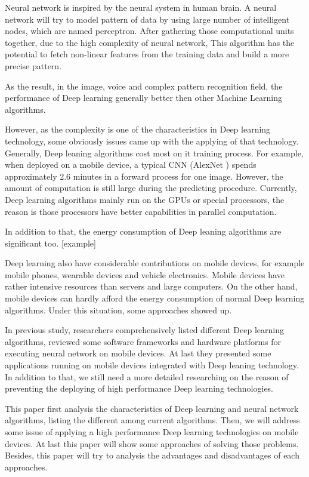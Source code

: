 \documentclass[article]{aaltoseries}
\begin{document}
Neural network is inspired by the neural system in human brain. A neural network will 
try to model pattern of data by using large number of intelligent nodes, which are named perceptron. 
After gathering those computational units together, due to the high complexity of neural network, 
This algorithm has the potential to fetch non-linear features from the training data 
and build a more precise pattern.

As the result, in the image, voice and complex pattern recognition field, the performance of Deep learning
generally better then other Machine Learning algorithms.  

However, as the complexity is one of the characteristics in Deep learning technology, some obviously
issues came up with the applying of that technology. Generally, Deep leaning algorithms cost most 
on it training process. For example, when deployed on a mobile device, a typical CNN (AlexNet \cite{NIPS2012_4824}) 
spends approximately 2.6 minutes in a forward process for one image. However, the amount of computation is 
still large
during the predicting procedure. Currently, Deep learning algorithms mainly run on the GPUs or special processors, 
the reason is those processors have better capabilities in parallel computation.

In addition to that, the energy consumption of Deep leaning algorithms are significant too. [example]

Deep learning also have considerable contributions on mobile devices, for example mobile phones, 
wearable devices and vehicle electronics. Mobile devices have rather intensive resources than 
servers and large computers. On the other hand, mobile devices can hardly afford the energy consumption
of normal Deep learning algorithms. Under this situation, some approaches showed up.

In previous study\cite{Ota:2017}, researchers comprehensively listed different Deep learning algorithms,
reviewed some software frameworks and hardware platforms for executing neural network on mobile devices.
At last they presented some applications running on mobile devices integrated with Deep leaning technology. 
In addition to that, we still need a more detailed researching on the reason of preventing the deploying of 
high performance Deep learning technologies.

This paper first analysis the characteristics of Deep learning and neural network algorithms,
listing the different among current algorithms. Then, we will address some issue of applying a high 
performance Deep learning technologies on mobile devices.
At last this paper will show some approaches of solving those problems. Besides, this paper will try to analysis the 
advantages and disadvantages of each approaches.
\end{document}
